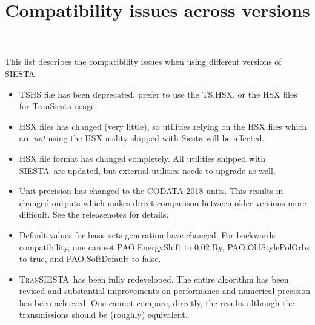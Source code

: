 \documentclass{article}
\title{Compatibility issues across versions}
\author{\siesta}
\newcommand\siesta{\textsc{SIESTA}}
\newcommand\tsiesta{\textsc{TranSIESTA}}
\begin{document}
\maketitle

\clearpage

This list describes the compatibility issues when using different versions of \siesta.

\begin{description}
  \setlength\itemsep{1pt}
  \setlength\topsep{1pt}

  \item[5.X]%
    \begin{itemize}

      \item TSHS file has been deprecated, prefer to use the TS.HSX, or the HSX files
        for TranSiesta usage.

      \item HSX files has changed (very little), so utilities relying on the HSX files
        which are \emph{not} using the HSX utility shipped with Siesta will be affected.
    \end{itemize}

  \item[5.0]%
  \begin{itemize}
    \item HSX file format has changed completely. All utilities shipped with \siesta\ are
    updated, but external utilities needs to upgrade as well.

    \item Unit precision has changed to the CODATA-2018 units. This results in changed outputs
      which makes direct comparison between older versions more difficult. See the releasenotes
      for details.

    \item Default values for basis sets generation have changed. For backwards compatibility,
    one can set PAO.EnergyShift to 0.02 Ry, PAO.OldStylePolOrbs to true, and
    PAO.SoftDefault to false.
  \end{itemize}

  \item[4.1]%
  \begin{itemize}
    \item %
    \tsiesta\ has been fully redeveloped. The entire algorithm has been revised and
    substantial improvements on performance and numerical precision has been achieved. One
    cannot compare, directly, the results although the transmissions should be (roughly)
    equivalent.


\end{itemize}
\end{description}
\end{document}
